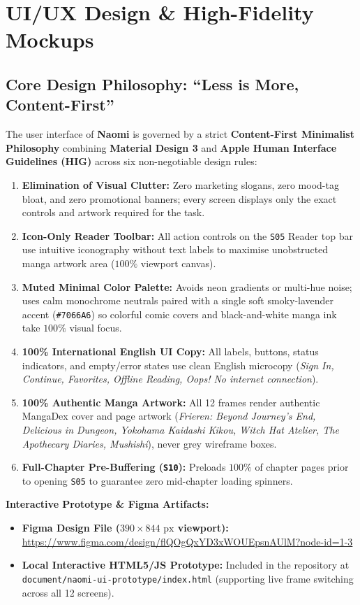 \section{UI/UX Design \& High-Fidelity Mockups}
\label{sec:uiux}

\subsection{Core Design Philosophy: ``Less is More, Content-First''}
\label{subsec:ui_philosophy}

The user interface of \textbf{Naomi} is governed by a strict \textbf{Content-First Minimalist Philosophy} combining \textbf{Material Design 3} and \textbf{Apple Human Interface Guidelines (HIG)} across six non-negotiable design rules:
\begin{enumerate}
    \item \textbf{Elimination of Visual Clutter:} Zero marketing slogans, zero mood-tag bloat, and zero promotional banners; every screen displays only the exact controls and artwork required for the task.
    \item \textbf{Icon-Only Reader Toolbar:} All action controls on the \texttt{S05} Reader top bar use intuitive iconography without text labels to maximise unobstructed manga artwork area ($100\%$ viewport canvas).
    \item \textbf{Muted Minimal Color Palette:} Avoids neon gradients or multi-hue noise; uses calm monochrome neutrals paired with a single soft smoky-lavender accent (\texttt{\#7066A6}) so colorful comic covers and black-and-white manga ink take $100\%$ visual focus.
    \item \textbf{100\% International English UI Copy:} All labels, buttons, status indicators, and empty/error states use clean English microcopy (\textit{Sign In, Continue, Favorites, Offline Reading, Oops! No internet connection}).
    \item \textbf{100\% Authentic Manga Artwork:} All 12 frames render authentic MangaDex cover and page artwork (\textit{Frieren: Beyond Journey's End, Delicious in Dungeon, Yokohama Kaidashi Kikou, Witch Hat Atelier, The Apothecary Diaries, Mushishi}), never grey wireframe boxes.
    \item \textbf{Full-Chapter Pre-Buffering (\texttt{S10}):} Preloads $100\%$ of chapter pages prior to opening \texttt{S05} to guarantee zero mid-chapter loading spinners.
\end{enumerate}

\noindent\textbf{Interactive Prototype \& Figma Artifacts:}
\begin{itemize}
    \item \textbf{Figma Design File ($390 \times 844\text{ px}$ viewport):} \url{https://www.figma.com/design/flQOgQxYD3xWOUEpsnAUlM?node-id=1-3}
    \item \textbf{Local Interactive HTML5/JS Prototype:} Included in the repository at \texttt{document/naomi-ui-prototype/index.html} (supporting live frame switching across all 12 screens).
\end{itemize}

